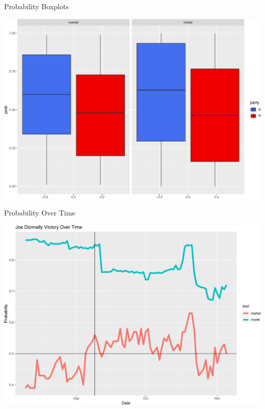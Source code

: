 \documentclass[ignorenonframetext,]{beamer}
\begin{document}
\begin{frame}{Probability Boxplots}

\includegraphics{markets_models_files/figure-beamer/prob box-1.pdf}

\end{frame}

\begin{frame}{Probability Over Time}

\includegraphics{markets_models_files/figure-beamer/unnamed-chunk-1-1.pdf}

\end{frame}
\end{document}
